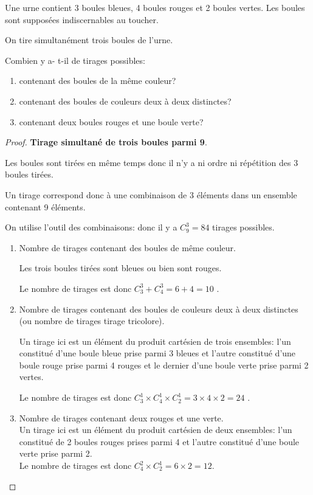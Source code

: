 \begin{exercice}

 Une urne contient 3 boules bleues, 4 boules rouges et 2 boules vertes. Les boules sont supposées indiscernables au toucher.
 
 On tire simultanément trois boules de l'urne.
 
Combien y a- t-il de tirages  possibles:
\begin{enumerate}
\item contenant des boules de  la même couleur?
\item contenant des boules de couleurs  deux à deux distinctes?
\item  contenant deux boules rouges et une boule verte?
\end{enumerate}
\end{exercice}
\begin{proof}
 \textbf{Tirage simultané de trois boules parmi 9}.

 Les boules  sont tirées en même temps  donc il n'y a ni ordre ni répétition des 3 boules tirées.

Un tirage    correspond donc à une combinaison de 3 éléments dans un ensemble contenant 9 éléments. 

On utilise l'outil des combinaisons: donc il y a $ C_{9}^{3}= 84$ tirages possibles.
\begin{enumerate}
\item Nombre de tirages contenant des boules de même couleur.

 Les trois boules tirées sont bleues ou bien  sont rouges.
 
Le nombre de tirages est donc $ C_{3}^{3}+ C_{4}^{3} = 6+4=10$ . 
\item Nombre de tirages contenant des boules de couleurs deux à deux distinctes (ou nombre de tirages  tirage tricolore).

Un tirage ici est un élément du produit cartésien de trois ensembles: l'un constitué d'une boule bleue prise parmi 3  bleues et l'autre constitué d'une boule rouge prise parmi 4  rouges et le dernier d'une boule verte prise parmi 2  vertes.

Le nombre de tirages est donc $ C_{3}^{1}\times C_{4}^{1}\times C_{2}^{1}=3\times 4\times 2=24 $ .
\item  Nombre de tirages contenant deux rouges et une verte.\\
Un tirage ici est un élément du produit cartésien de deux ensembles: l'un constitué de 2 boules rouges prises parmi 4 et l'autre constitué d'une boule verte prise parmi 2.\\
Le nombre de tirages est donc  $ C_{4}^{2}\times C_{2}^{1}=6 \times 2 =12 $. 
\end{enumerate}
\end{proof}
